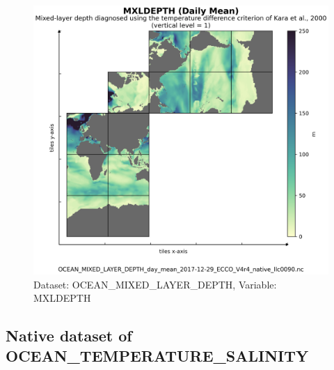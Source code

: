 \begin{figure}[H]
\centering
\includegraphics[scale=0.55]{../images/plots/v4r4/native_plots/Ocean_Mixed_Layer_Depth/MXLDEPTH.png}
\caption{Dataset: OCEAN\_MIXED\_LAYER\_DEPTH, Variable: MXLDEPTH}
\label{tab:table-OCEAN_MIXED_LAYER_DEPTH_MXLDEPTH-Plot}
\end{figure}
\newpage
\subsection{Native dataset of OCEAN\_TEMPERATURE\_SALINITY}
\newp
